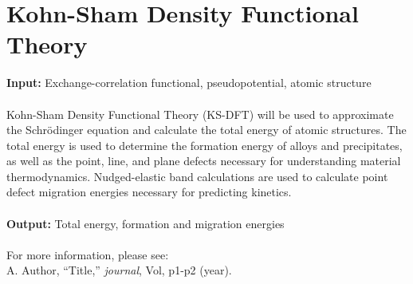 \documentclass[12pt]{article}
\begin{document}
\section{Kohn-Sham Density Functional Theory}
 \textbf{Input:}  Exchange-correlation functional, pseudopotential, atomic structure\\
 \\
Kohn-Sham Density Functional Theory (KS-DFT) will be used to approximate the Schr\"{o}dinger equation and calculate the total energy of atomic structures. The total energy is used to determine the formation energy of alloys and precipitates, as well as the point, line, and plane defects necessary for understanding material thermodynamics. Nudged-elastic band calculations are used to calculate point defect migration energies necessary for predicting kinetics.\\
\\
\textbf{Output:} Total energy, formation and migration energies\\
\\
For more information, please see:
\\
A. Author, ``Title,'' \textit{journal}, Vol, p1-p2 (year).

\end{document}
